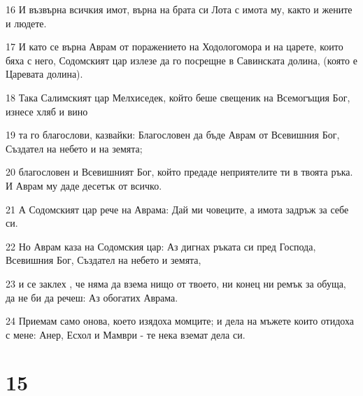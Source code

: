\par 16 И възвърна всичкия имот, върна на брата си Лота с имота му, както и жените и людете.
\par 17 И като се върна Аврам от поражението на Ходологомора и на царете, които бяха с него, Содомският цар излезе да го посрещне в Савинската долина, (която е Царевата долина).
\par 18 Така Салимският цар Мелхиседек, който беше свещеник на Всемогъщия Бог, изнесе хляб и вино
\par 19 та го благослови, казвайки: Благословен да бъде Аврам от Всевишния Бог, Създател на небето и на земята;
\par 20 благословен и Всевишният Бог, който предаде неприятелите ти в твоята ръка. И Аврам му даде десетък от всичко.
\par 21 А Содомският цар рече на Аврама: Дай ми човеците, а имота задръж за себе си.
\par 22 Но Аврам каза на Содомския цар: Аз дигнах ръката си пред Господа, Всевишния Бог, Създател на небето и земята,
\par 23 и се заклех , че няма да взема нищо от твоето, ни конец ни ремък за обуща, да не би да речеш: Аз обогатих Аврама.
\par 24 Приемам само онова, което изядоха момците; и дела на мъжете които отидоха с мене: Анер, Есхол и Мамври - те нека вземат дела си.

\chapter{15}

